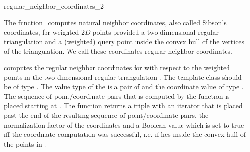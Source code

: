 
\begin{ccRefFunction}{regular_neighbor_coordinates_2}  %

\ccDefinition
  
The function \ccRefName\ computes natural neighbor coordinates, also
called Sibson's coordinates, for weighted $2D$ points provided a
two-dimensional regular triangulation and a (weighted) query point
inside the convex hull of the vertices of the triangulation. We call these 
coordinates regular neighbor coordinates.



 {
  computes the regular neighbor coordinates for  with respect
  to the weighted points in the two-dimensional regular triangulation
  .  The template class  should be of type
  .  The value type of the
   is a pair of  and the
  coordinate value of type . The sequence of
  point/coordinate pairs that is computed by the function is placed
  starting at . The function returns a triple with an
  iterator that is placed past-the-end of the resulting sequence of
  point/coordinate pairs, the normalization factor of the coordinates
  and a Boolean value which is set to true iff the coordinate
  computation was successful, i.e. if  lies inside the
  convex hull of the points in . 
  }  


\end{ccRefFunction}

